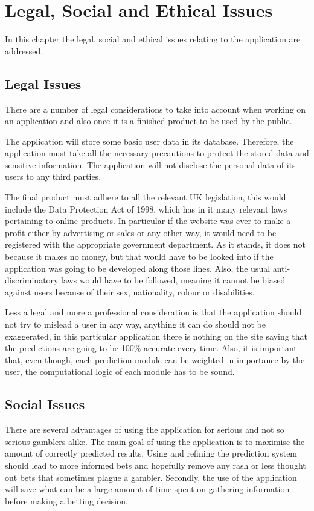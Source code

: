 \chapter{Legal, Social and Ethical Issues}
\label{ch:lesp_issues}
In this chapter the legal, social and ethical issues relating to the application are addressed.  

\section{Legal Issues}
\label{sec:legalissues_lesp}
There are a number of legal considerations to take into account when working on an application and also once it is a finished product to be used by the public.

The application will store some basic user data in its database. Therefore, the application must take all the necessary precautions to protect the stored data and sensitive information. The application will not disclose the personal data of its users to any third parties.

The final product must adhere to all the relevant UK legislation, this would include the Data Protection Act of 1998, which has in it many relevant laws pertaining to online products.  In particular if the website was ever to make a profit either by advertising or sales or any other way, it would need to be registered with the appropriate government department. As it stands, it does not because it makes no money, but that would have to be looked into if the application was going to be developed along those lines. Also, the usual anti-discriminatory laws would have to be followed, meaning it cannot be biased against users because of their sex, nationality, colour or disabilities.

Less a legal and more a professional consideration is that the application should not try to mislead a user in any way, anything it can do should not be exaggerated, in this particular application there is nothing on the site saying that the predictions are going to be 100\% accurate every time. Also, it is important that, even though, each prediction module can be weighted in importance by the user, the computational logic of each module has to be sound.
\section{Social Issues}
\label{sec:socialissues_lesp}
There are several advantages of using the application for serious and not so serious gamblers alike. The main goal of using the application is to maximise the amount of correctly predicted results. Using and refining the prediction system should lead to more informed bets and hopefully remove any rash or less thought out bets that sometimes plague a gambler. Secondly, the use of the application will save what can be a large amount of time spent on gathering information before making a betting decision.

